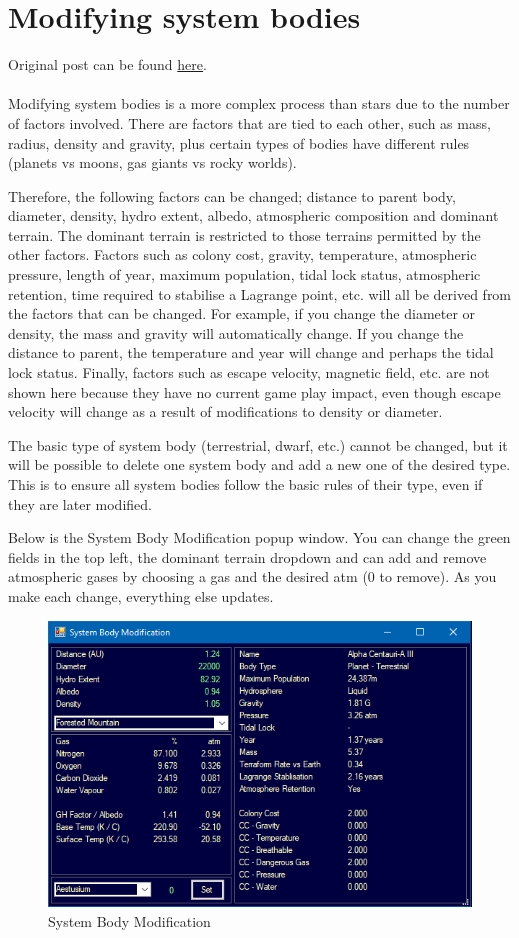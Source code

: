 \documentclass[../../Aurora C# unofficial manual.tex]{subfiles}
\begin{document}
	\section{Modifying system bodies}\label{3_modifying system_bodies}
	Original post can be found
	\href{http://aurora2.pentarch.org/index.php?topic=8495.msg118744#msg118744}{here}.
	\\\\
	
	Modifying system bodies is a more complex process than stars due to the number of factors involved. There are factors that are tied to each other, such as mass, radius, density and gravity, plus certain types of bodies have different rules (planets vs moons, gas giants vs rocky worlds).
	
	Therefore, the following factors can be changed; distance to parent body, diameter, density, hydro extent, albedo, atmospheric composition and dominant terrain. The dominant terrain is restricted to those terrains permitted by the other factors. Factors such as colony cost, gravity, temperature, atmospheric pressure, length of year, maximum population, tidal lock status, atmospheric retention, time required to stabilise a Lagrange point, etc. will all be derived from the factors that can be changed. For example, if you change the diameter or density, the mass and gravity will automatically change. If you change the distance to parent, the temperature and year will change and perhaps the tidal lock status. Finally, factors such as escape velocity, magnetic field, etc. are not shown here because they have no current game play impact, even though escape velocity will change as a result of modifications to density or diameter.
	
	The basic type of system body (terrestrial, dwarf, etc.) cannot be changed, but it will be possible to delete one system body and add a new one of the desired type. This is to ensure all system bodies follow the basic rules of their type, even if they are later modified.
	
	Below is the System Body Modification popup window. You can change the green fields in the top left, the dominant terrain dropdown and can add and remove atmospheric gases by choosing a gas and the desired atm (0 to remove). As you make each change, everything else updates.
	\begin{figure}[H]
		\centering
		\includegraphics[width=0.5\linewidth]{images/SystemBodyModification}
		\caption[System Body Modification]{System Body Modification}
		\label{fig:systembodymodification}
	\end{figure}
	
\end{document}
